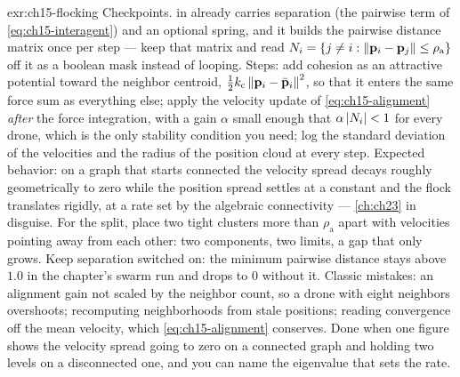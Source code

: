 
\begin{solution}{exr:ch15-flocking}
Checkpoints.  in  already carries
separation (the pairwise term of \cref{eq:ch15-interagent}) and an optional spring, and it
builds the pairwise distance matrix once per step --- keep that matrix and read
$N_i=\left\{ j\ne i : \left\lVert \mathbf{p}_i-\mathbf{p}_j \right\rVert\le\rho_{\mathrm{a}} \right\}$ off it as a boolean mask
instead of looping. Steps: add cohesion as an attractive potential toward the neighbor
centroid, $\tfrac12k_{\mathrm{c}}\left\lVert \mathbf{p}_i-\bar{\mathbf{p}}_i \right\rVert^2$, so that it enters the same
force sum as everything else; apply the velocity update of \cref{eq:ch15-alignment}
\emph{after} the force integration, with a gain $\alpha$ small enough that
$\alpha\left\lvert N_i \right\rvert<1$ for every drone, which is the only stability condition you need; log
the standard deviation of the velocities and the radius of the position cloud at every
step. Expected behavior: on a graph that starts connected the velocity spread decays
roughly geometrically to zero while the position spread settles at a constant and the
flock translates rigidly, at a rate set by the algebraic connectivity --- \cref{ch:ch23}
in disguise. For the split, place two tight clusters more than $\rho_{\mathrm{a}}$ apart
with velocities pointing away from each other: two components, two limits, a gap that only
grows. Keep separation switched on: the minimum pairwise distance stays above $1.0$ in the
chapter's swarm run and drops to $0$ without it. Classic mistakes: an alignment gain not
scaled by the neighbor count, so a drone with eight neighbors overshoots; recomputing
neighborhoods from stale positions; reading convergence off the mean velocity, which
\cref{eq:ch15-alignment} conserves. Done when one figure shows the velocity spread going
to zero on a connected graph and holding two levels on a disconnected one, and you can
name the eigenvalue that sets the rate.
\end{solution}

